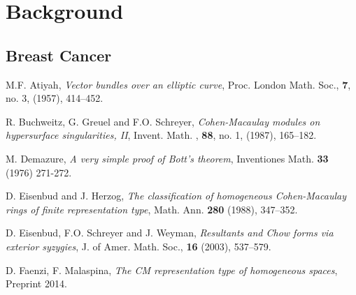 \documentclass[a4paper,10pt]{book}
\begin{document}

\chapter{Background}

\section{Breast Cancer}



\backmatter
{}



\begin{thebibliography}{999}


    M.F. Atiyah, {\em Vector bundles over an elliptic curve}, Proc. London Math. Soc., {\bf 7}, no. 3, (1957),
    414--452.


    R. Buchweitz, G. Greuel  and F.O. Schreyer, {\em Cohen-Macaulay modules on hypersurface singularities, II},
     Invent. Math. , {\bf 88}, no.  1, (1987), 165--182.


 M. Demazure, {\em A very simple proof of Bott's theorem}, Inventiones Math. {\bf 33} (1976) 271-272.




       D. Eisenbud and J. Herzog,  {\em The classification of homogeneous {C}ohen-{M}acaulay rings of finite representation type}, Math. Ann. {\bf 280} (1988), 347--352.



 D. Eisenbud, F.O. Schreyer  and J. Weyman,
    {\em Resultants and Chow forms via exterior syzygies},  J. of Amer. Math. Soc.,  {\bf 16}
    (2003), 537--579.

 D. Faenzi, F. Malaspina, {\em The CM representation type of homogeneous spaces}, Preprint 2014.


\end{thebibliography}
\end{document}
